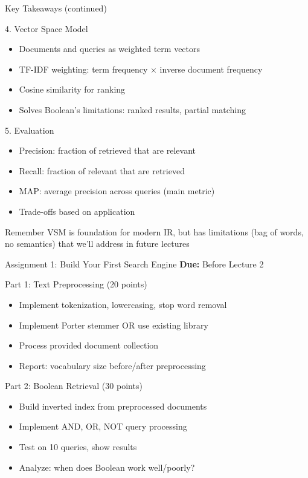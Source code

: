 \documentclass[aspectratio=169]{beamer}
\newif\ifanimated
\newcommand{\cpause}{\ifanimated\pause\fi}
\begin{document}
\begin{frame}[shrink=5]{Key Takeaways (continued)}
\begin{block}{4. Vector Space Model}
\begin{itemize}
    \item Documents and queries as weighted term vectors
    \item TF-IDF weighting: term frequency × inverse document frequency
    \item Cosine similarity for ranking
    \item Solves Boolean's limitations: ranked results, partial matching
\end{itemize}
\cpause
\end{block}
\cpause
\begin{block}{5. Evaluation}
\begin{itemize}
    \item Precision: fraction of retrieved that are relevant
    \item Recall: fraction of relevant that are retrieved
    \item MAP: average precision across queries (main metric)
    \item Trade-offs based on application
\end{itemize}
\cpause
\end{block}
\cpause
\begin{alertblock}{Remember}
VSM is foundation for modern IR, but has limitations (bag of words, no semantics) that we'll address in future lectures
\end{alertblock}
\cpause
\end{frame}

\begin{frame}[shrink=5]{Assignment 1: Build Your First Search Engine}
\textbf{Due:} Before Lecture 2

\vspace{1em}

\begin{block}{Part 1: Text Preprocessing (20 points)}
\begin{itemize}
    \item Implement tokenization, lowercasing, stop word removal
    \item Implement Porter stemmer OR use existing library
    \item Process provided document collection
    \item Report: vocabulary size before/after preprocessing
\end{itemize}
\cpause
\end{block}
\cpause
\begin{block}{Part 2: Boolean Retrieval (30 points)}
\begin{itemize}
    \item Build inverted index from preprocessed documents
    \item Implement AND, OR, NOT query processing
    \item Test on 10 queries, show results
    \item Analyze: when does Boolean work well/poorly?
\end{itemize}
\end{block}
\end{frame}
\end{document}
